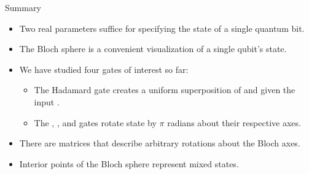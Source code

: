 \begin{frame}{Summary}

\begin{itemize}
    \item Two real parameters suffice for specifying the state of a single quantum bit.
    \item The Bloch sphere is a convenient visualization of a single qubit's state.
    \item We have studied four gates of interest so far:
    \begin{itemize}
        \item The Hadamard gate creates a uniform superposition of  and  given the input .
        \item The \PauliX{}, \PauliY{}, and \PauliZ{} gates rotate state by $\pi$ radians about their respective axes.
    \end{itemize}
    \item There are matrices that describe arbitrary rotations about the Bloch axes. 
    \item Interior points of the Bloch sphere represent mixed states.
\end{itemize}
\end{frame}

